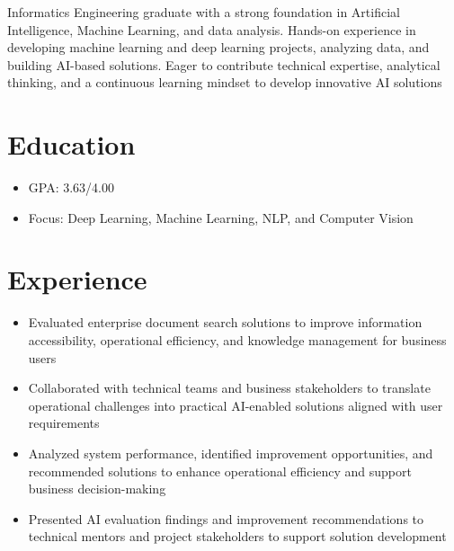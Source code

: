 Informatics Engineering graduate with a strong foundation in Artificial Intelligence, Machine Learning, and data analysis. Hands-on experience in developing machine learning and deep learning projects, analyzing data, and building AI-based solutions. Eager to contribute technical expertise, analytical thinking, and a continuous learning mindset to develop innovative AI solutions

\section*{Education}
\begin{itemize}
  \item GPA: 3.63/4.00
  \item Focus: Deep Learning, Machine Learning, NLP, and Computer Vision
\end{itemize}

\section*{Experience}
\begin{itemize}
  \item Evaluated enterprise document search solutions to improve information accessibility, operational efficiency, and knowledge management for business users
  \item Collaborated with technical teams and business stakeholders to translate operational challenges into practical AI-enabled solutions aligned with user requirements
  \item Analyzed system performance, identified improvement opportunities, and recommended solutions to enhance operational efficiency and support business decision-making
  \item Presented AI evaluation findings and improvement recommendations to technical mentors and project stakeholders to support solution development
\end{itemize}

